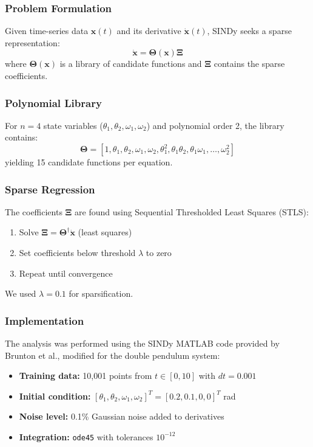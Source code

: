 \documentclass[12pt,a4paper]{article}
\begin{document}
\subsubsection{Problem Formulation}

Given time-series data $\mathbf{x}(t)$ and its derivative $\dot{\mathbf{x}}(t)$, SINDy seeks a sparse representation:
\begin{equation}
    \dot{\mathbf{x}} = \boldsymbol{\Theta}(\mathbf{x}) \boldsymbol{\Xi}
\end{equation}
where $\boldsymbol{\Theta}(\mathbf{x})$ is a library of candidate functions and $\boldsymbol{\Xi}$ contains the sparse coefficients.

\subsubsection{Polynomial Library}

For $n = 4$ state variables ($\theta_1, \theta_2, \omega_1, \omega_2$) and polynomial order 2, the library contains:
\begin{equation}
    \boldsymbol{\Theta} = [1, \theta_1, \theta_2, \omega_1, \omega_2, \theta_1^2, \theta_1\theta_2, \theta_1\omega_1, \ldots, \omega_2^2]
\end{equation}
yielding 15 candidate functions per equation.

\subsubsection{Sparse Regression}

The coefficients $\boldsymbol{\Xi}$ are found using Sequential Thresholded Least Squares (STLS):
\begin{enumerate}
    \item Solve $\boldsymbol{\Xi} = \boldsymbol{\Theta}^\dagger \dot{\mathbf{x}}$ (least squares)
    \item Set coefficients below threshold $\lambda$ to zero
    \item Repeat until convergence
\end{enumerate}

We used $\lambda = 0.1$ for sparsification.

\subsubsection{Implementation}

The analysis was performed using the SINDy MATLAB code provided by Brunton et al., modified for the double pendulum system:
\begin{itemize}
    \item \textbf{Training data:} 10,001 points from $t \in [0, 10]$ with $dt = 0.001$
    \item \textbf{Initial condition:} $[\theta_1, \theta_2, \omega_1, \omega_2]^T = [0.2, 0.1, 0, 0]^T$ rad
    \item \textbf{Noise level:} 0.1\% Gaussian noise added to derivatives
    \item \textbf{Integration:} \texttt{ode45} with tolerances $10^{-12}$
\end{itemize}
\end{document}
